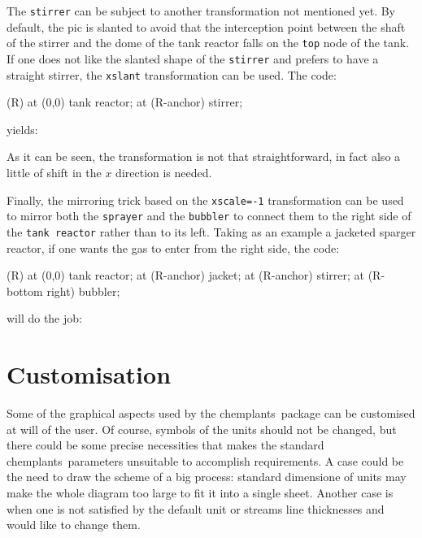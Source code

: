 \documentclass[12pt]{article}						%
\newcommand*{\chpn}[1]{\texttt{#1}}				%
\newcommand*{\chpp}[1]{\texttt{#1}}				%
\newcommand*{\chemplants}{chemplants}
\begin{document}
The \chpp{stirrer} can be subject to another transformation not mentioned yet. By
default, the pic is slanted to avoid that the interception point between the
shaft of the stirrer and the dome of the tank reactor falls on the \chpn{top}
node of the tank. If one does not like the slanted shape of the \chpp{stirrer}
and prefers to have a straight stirrer, the \verb|xslant| transformation can be
used. The code:
\begin{chpcode}
	\pic (R) at (0,0) {tank reactor};
	\pic[xslant=-0.285, xshift=-2.04] at (R-anchor) {stirrer};
\end{chpcode}
yields:
\begin{center}
\end{center}
As it can be seen, the transformation is not that straightforward, in fact also a
little of shift in the $x$ direction is needed.

Finally, the mirroring trick based on the \verb|xscale=-1| transformation can be
used to mirror both the \chpp{sprayer} and the \chpp{bubbler} to connect
them to the right side of the \chpp{tank reactor} rather than to its left.
Taking as an example a jacketed sparger reactor, if one wants the gas to enter
from the right side, the code:
\begin{chpcode}
	\pic (R) at (0,0) {tank reactor};
	\pic at (R-anchor) {jacket};
	\pic at (R-anchor) {stirrer};
	\pic[xscale=-1] at (R-bottom right) {bubbler};
\end{chpcode}
will do the job:
\begin{center}
\end{center}

\section{Customisation}

Some of the  graphical aspects used by the \chemplants\ package can be
customised at will of the user. Of course, symbols of the units should not be
changed, but there could be some precise necessities that makes the standard
\chemplants\ parameters unsuitable to accomplish requirements. A case could be
the need to draw the scheme of a big process: standard dimensione of units may
make the whole diagram too large to fit it into a single sheet. Another case is
when one is not satisfied by the default unit or streams line thicknesses and
would like to change them.
\end{document}
